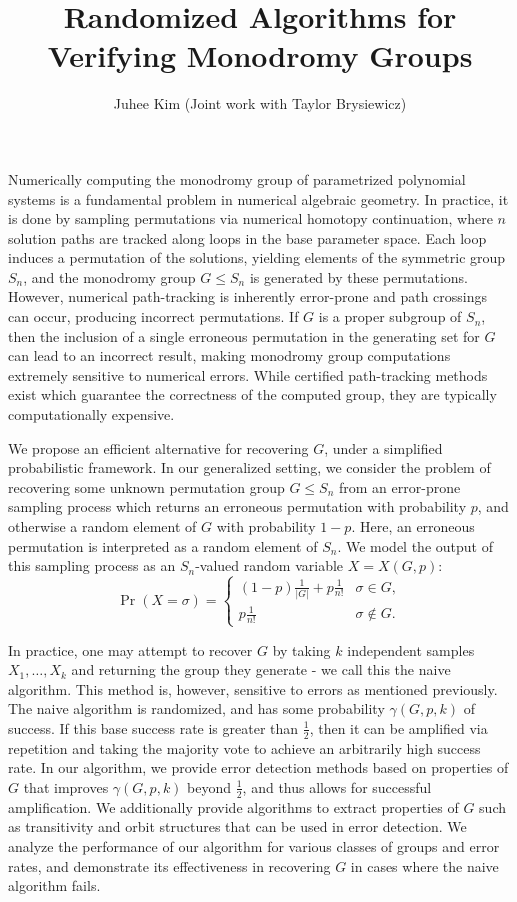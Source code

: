 \documentclass[11pt,reqno]{amsart}
\title{Randomized Algorithms for Verifying Monodromy Groups}
\author{Juhee Kim (Joint work with Taylor Brysiewicz)}
\begin{document}
\maketitle

Numerically computing the monodromy group of parametrized polynomial systems is a fundamental problem in numerical algebraic geometry. In practice, it is done by sampling permutations via numerical homotopy continuation, where $n$ solution paths are tracked along loops in the base parameter space. Each loop induces a permutation of the solutions, yielding elements of the symmetric group $S_n$, and the monodromy group $G \leq S_n$ is generated by these permutations. However, numerical path-tracking is inherently error-prone and path crossings can occur, producing incorrect permutations. If $G$ is a proper subgroup of $S_n$, then the inclusion of a single erroneous permutation in the generating set for $G$ can lead to an incorrect result, making monodromy group computations extremely sensitive to numerical errors. While certified path-tracking methods exist which guarantee the correctness of the computed group, they are typically computationally expensive.

We propose an efficient alternative for recovering $G$, under a simplified probabilistic framework. In our generalized setting, we consider the problem of recovering some unknown permutation group $G\leq S_n$ from an error-prone sampling process which returns an erroneous permutation with probability $p$, and otherwise a random element of $G$ with probability $1-p$. Here, an erroneous permutation is interpreted as a random element of $S_n$. We model the output of this sampling process as an $S_n$-valued random variable $X= X(G,p)$:
\[
\Pr(X = \sigma) = \begin{cases}
(1-p)\frac{1}{|G|} + p \frac{1}{n!} &  \sigma \in G, \\
p\frac{1}{n!} &  \sigma \notin G.
\end{cases}
\]

In practice, one may attempt to recover $G$ by taking $k$ independent samples $X_1, \ldots, X_k$ and returning the group they generate - we call this the naive algorithm. This method is, however, sensitive to errors as mentioned previously. The naive algorithm is randomized, and has some probability $\gamma(G,p,k)$ of success. If this base success rate is greater than $\frac 1 2$, then it can be amplified via repetition and taking the majority vote to achieve an arbitrarily high success rate. In our algorithm, we provide error detection methods based on properties of $G$ that improves $\gamma(G,p,k)$ beyond $\frac 1 2 $, and thus allows for successful amplification. We additionally provide algorithms to extract properties of $G$ such as transitivity and orbit structures that can be used in error detection. We analyze the performance of our algorithm for various classes of groups and error rates, and demonstrate its effectiveness in recovering $G$ in cases where the naive algorithm fails.
\end{document}
